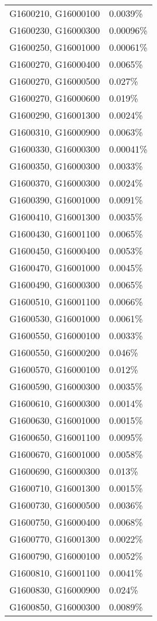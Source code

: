 \begin{longtable}[]{@{}ll@{}}
G1600210, G16000100 & 0.0039\% \\
G1600230, G16000300 & 0.00096\% \\
G1600250, G16001000 & 0.00061\% \\
G1600270, G16000400 & 0.0065\% \\
G1600270, G16000500 & 0.027\% \\
G1600270, G16000600 & 0.019\% \\
G1600290, G16001300 & 0.0024\% \\
G1600310, G16000900 & 0.0063\% \\
G1600330, G16000300 & 0.00041\% \\
G1600350, G16000300 & 0.0033\% \\
G1600370, G16000300 & 0.0024\% \\
G1600390, G16001000 & 0.0091\% \\
G1600410, G16001300 & 0.0035\% \\
G1600430, G16001100 & 0.0065\% \\
G1600450, G16000400 & 0.0053\% \\
G1600470, G16001000 & 0.0045\% \\
G1600490, G16000300 & 0.0065\% \\
G1600510, G16001100 & 0.0066\% \\
G1600530, G16001000 & 0.0061\% \\
G1600550, G16000100 & 0.0033\% \\
G1600550, G16000200 & 0.046\% \\
G1600570, G16000100 & 0.012\% \\
G1600590, G16000300 & 0.0035\% \\
G1600610, G16000300 & 0.0014\% \\
G1600630, G16001000 & 0.0015\% \\
G1600650, G16001100 & 0.0095\% \\
G1600670, G16001000 & 0.0058\% \\
G1600690, G16000300 & 0.013\% \\
G1600710, G16001300 & 0.0015\% \\
G1600730, G16000500 & 0.0036\% \\
G1600750, G16000400 & 0.0068\% \\
G1600770, G16001300 & 0.0022\% \\
G1600790, G16000100 & 0.0052\% \\
G1600810, G16001100 & 0.0041\% \\
G1600830, G16000900 & 0.024\% \\
G1600850, G16000300 & 0.0089\% \\

\end{longtable}
